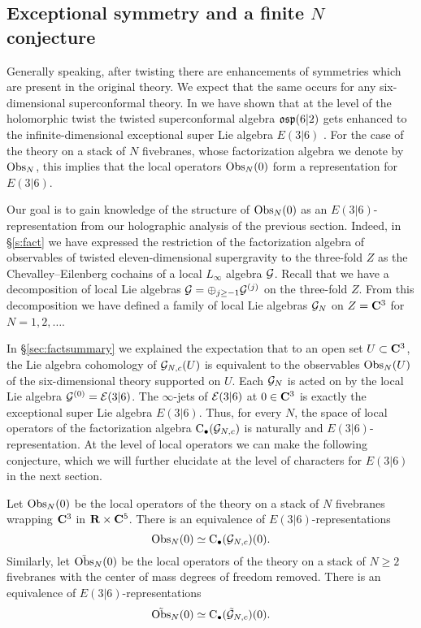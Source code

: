 \documentclass[../main.tex]{subfiles}
\begin{document}
\subsection{Exceptional symmetry and a finite $N$ conjecture}

Generally speaking, after twisting there are enhancements of symmetries which are present in the original theory. 
We expect that the same occurs for any six-dimensional superconformal theory. 
In \cite{SW6d} we have shown that at the level of the holomorphic twist the twisted superconformal algebra $\mathfrak{osp}(6|2)$ gets enhanced to the infinite-dimensional exceptional super Lie algebra $E(3|6)$ \cite{KacClass}. 
For the case of the theory on a stack of $N$ fivebranes, whose factorization algebra we denote by $\text{Obs}_N$, this implies that the local operators $\text{Obs}_{N}(0)$ form a representation for $E(3|6)$.

Our goal is to gain knowledge of the structure of $\text{Obs}_N(0)$ as an $E(3|6)$-representation from our holographic analysis of the previous section.
Indeed, in \S \ref{s:fact} we have expressed the restriction of the factorization algebra of observables of twisted eleven-dimensional supergravity to the three-fold $Z$ as the Chevalley--Eilenberg cochains of a local $L_\infty$ algebra $\mathcal{G}$. 
Recall that we have a decomposition of local Lie algebras $\mathcal{G} = \oplus_{j \geq -1} \mathcal{G}^{(j)}$ on the three-fold $Z$. 
From this decomposition we have defined a family of local Lie algebras $\mathcal{G}_{N}$ on $Z = \mathbf{C}^3$ for $N=1,2,\ldots$.

In \S \ref{sec:factsummary} we explained the expectation that to an open set $U \subset \mathbf{C}^3$, the Lie algebra cohomology of $\mathcal{G}_{N,c}(U)$ is equivalent to the observables $\text{Obs}_N(U)$ of the six-dimensional theory supported on $U$. 
Each $\mathcal{G}_N$ is acted on by the local Lie algebra $\mathcal{G}^{(0)} = \mathcal{E}(3|6)$.
The $\infty$-jets of $\mathcal{E}(3|6)$ at $0 \in \mathbf{C}^3$ is exactly the exceptional super Lie algebra $E(3|6)$.  
Thus, for every $N$, the space of local operators of the factorization algebra ${\mathrm{C}}_\bullet(\mathcal{G}_{N,c})$ is naturally and $E(3|6)$-representation. 
At the level of local operators we can make the following conjecture, which we will further elucidate at the level of characters for $E(3|6)$ in the next section.

\begin{conj}
\label{conj:ops}
Let $\text{Obs}_N(0)$ be the local operators of the theory on a stack of $N$ fivebranes wrapping $\mathbf{C}^3$ in $\mathbf{R} \times \mathbf{C}^5$. 
There is an equivalence of $E(3|6)$-representations
\begin{equation}
\text{Obs}_N(0) \simeq {\mathrm{C}}_\bullet (\mathcal{G}_{N,c}) (0) .
\end{equation}
Similarly, let $\tilde {\text{Obs}}_{N}(0)$ be the local operators of the theory on a stack of $N \geq 2$ fivebranes with the center of mass degrees of freedom removed. 
There is an equivalence of $E(3|6)$-representations
\begin{equation}
\tilde {\text{Obs}}_N(0) \simeq {\mathrm{C}}_\bullet (\tilde{\mathcal{G}}_{N,c}) (0) .
\end{equation}
\end{conj}
\end{document}
